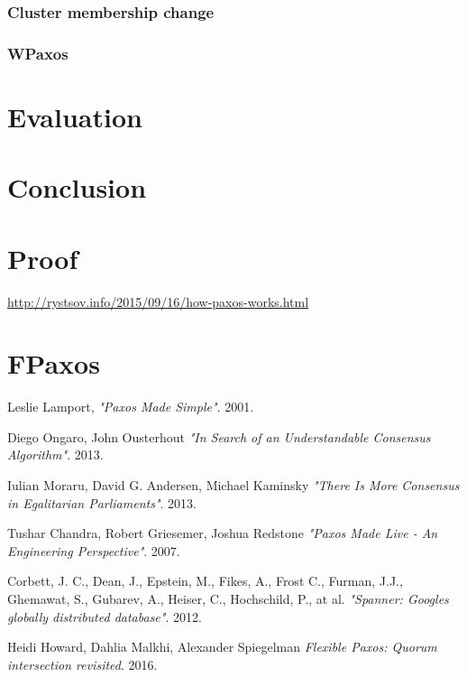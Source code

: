 \documentclass[12pt]{article}
\begin{document}
\subsubsection{Cluster membership change}
\subsubsection{WPaxos}
\section{Evaluation}
\section{Conclusion}

\begin{appendices}
\section{Proof}
\href{http://rystsov.info/2015/09/16/how-paxos-works.html}{http://rystsov.info/2015/09/16/how-paxos-works.html}
\section{FPaxos}
\end{appendices}

\newpage

\begin{thebibliography}{9}

  Leslie Lamport,
  \emph{"Paxos Made Simple"}.
  2001.

  Diego Ongaro, John Ousterhout
  \emph{"In Search of an Understandable Consensus Algorithm"}.
  2013.

  Iulian Moraru, David G. Andersen, Michael Kaminsky
  \emph{"There Is More Consensus in Egalitarian Parliaments"}.
  2013.

  Tushar Chandra, Robert Griesemer, Joshua Redstone
  \emph{"Paxos Made Live - An Engineering Perspective"}.
  2007.

  Corbett, J. C., Dean, J., Epstein, M., Fikes, A., Frost C., Furman, J.J., Ghemawat, S., Gubarev, A., Heiser, C., Hochschild, P., at al.
  \emph{"Spanner: Googles globally distributed database"}.
  2012.

  Heidi Howard, Dahlia Malkhi, Alexander Spiegelman
  \emph{Flexible Paxos: Quorum intersection revisited}.
  2016.

\end{thebibliography}
\end{document}
